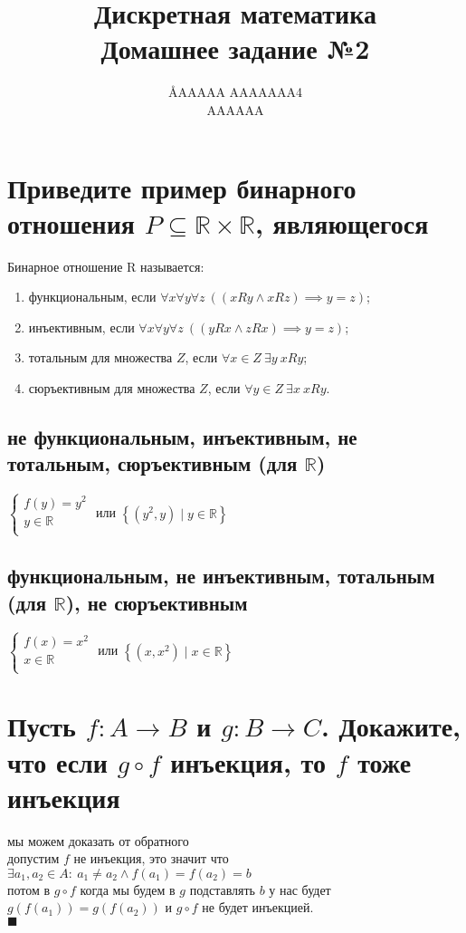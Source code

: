 \documentclass{article}
\title{Дискретная математика \\ Домашнее задание №2}
\author{\AA{AAAAA AAAAAAA}{4} \\ AAAAAA}
\newcommand{\R}{\mathbb{R}}
\renewcommand{\l}{\left}
\renewcommand{\r}{\right}
\begin{document}
  \maketitle

  \section{Приведите пример бинарного отношения $P \subseteq \R \times \R$, являющегося}
  Бинарное отношение R называется: %
  \begin{enumerate}
    \item функциональным, если $\forall x\forall y\forall z\ ((xRy \land xRz) \implies y = z)$;
    \item инъективным, если $\forall x\forall y\forall z\ ((yRx \land zRx) \implies y = z)$;
    \item тотальным для множества $Z$, если $\forall x \in Z\ \exists y\ xRy$;
    \item сюръективным для множества $Z$, если $\forall y \in Z\ \exists x\ xRy$.
  \end{enumerate}
  \subsection{не функциональным, инъективным, не тотальным, сюръективным (для $\R$)}
  $\begin{cases}
    f(y) = y^2 \\
    y \in \R \\
  \end{cases}$ или $ \l\{(y^2, y) \mid y \in \R\r\}$
  \subsection{функциональным, не инъективным, тотальным (для $\R$), не сюръективным}
  $\begin{cases}
    f(x) = x^2 \\
    x \in \R \\
  \end{cases}$ или $ \l\{(x, x^2) \mid x \in \R\r\}$

  \section{Пусть $f : A \to B$ и $g : B \to C$. Докажите, что если $g \circ f$ инъекция, то $f$ тоже инъекция}
  мы можем доказать от обратного \\
  допустим $f$ не инъекция, это значит что $\exists a_1,a_2\in A:\ a_1\neq a_2 \land f(a_1)=f(a_2)=b $ \\
  потом в $g \circ f$ когда мы будем в $g$ подставлять $b$ у нас будет $g\l(f\l(a_1\r)\r) = g\l(f\l(a_2\r)\r)$
  и $g \circ f$ не будет инъекцией. \\
  $\blacksquare$
\end{document}
